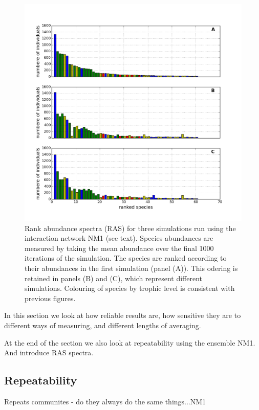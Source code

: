 \begin{figure}[hp]
	\centering
	\includegraphics[width=1.0\linewidth]{"./chapters/chapter04b/figures/ras_3examples"}
    \caption{Rank abundance spectra (RAS) for three simulations run using the interaction network NM1 (see text). Species abundances are measured by taking the mean abundance over the final 1000 iterations of the simulation. The species are ranked according to their abundances in the first simulation (panel (A)). This odering is retained in panels (B) and (C), which represent different simulations. Colouring of species by trophic level is consistent with previous figures.}    
    \label{fig:ras_3examples}
\end{figure}

In this section we look at how reliable results are, how sensitive they are to different ways of measuring, and different lengths of averaging. 

At the end of the section we also look at repeatability using the ensemble NM1. And introduce RAS spectra.

\subsection{Repeatability}

Repeats communites - do they always do the same things...NM1

